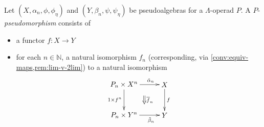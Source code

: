\begin{Defi}\label{Defi:pseudomorphism-lop}
Let $(X, \alpha_n,\phi,\phi_\eta)$ and $(Y, \beta_n,\psi,\psi_{\eta})$ be pseudoalgebras for a $\Lambda$-operad $P$. A $P$-\textit{pseudomorphism} consists of
    \begin{itemize}
        \item a functor $f \colon X \rightarrow Y$
        \item for each $n \in \mathbb{N}$, a natural isomorphism $f_n$ (corresponding, via \cref{conv:equiv-maps,rem:lim-v-2lim}) to a natural isomorphism
            \[
                \xy
                    (0,0)*+{P_n \times X^n}="00";
                    (20,0)*+{X}="10";
                    (0,-15)*+{P_n \times Y^n}="01";
                    (20,-15)*+{Y}="11";
                    {\ar^>>>>>{\tilde{\alpha}_n} "00" ; "10"};
                    {\ar^{f} "10" ; "11"};
                    {\ar_{1 \times f^n} "00" ; "01"};
                    {\ar_>>>>>{\tilde{\beta}_n} "01" ; "11"};
                    {\ar@{=>}^{\overline{f}_n} (10,-5.5) ; (10,-9.5)};
                \endxy
            \]


\end{itemize}
\end{Defi}
